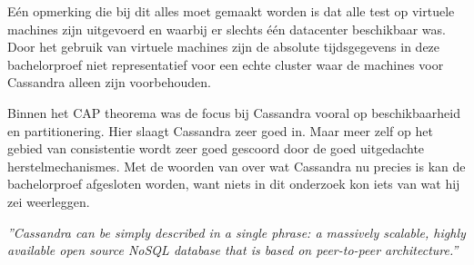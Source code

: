 Eén opmerking die bij dit alles moet gemaakt worden is dat alle test op virtuele machines zijn uitgevoerd en waarbij er slechts één datacenter beschikbaar was.
Door het gebruik van virtuele machines zijn de absolute tijdsgegevens in deze bachelorproef niet representatief voor een echte cluster waar de machines voor Cassandra alleen zijn voorbehouden.

Binnen het CAP theorema was de focus bij Cassandra vooral op beschikbaarheid en partitionering.
Hier slaagt Cassandra zeer goed in.
Maar meer zelf op het gebied van consistentie wordt zeer goed gescoord door de goed uitgedachte herstelmechanismes.
Met de woorden van \cite{kan2014cassandra} over wat Cassandra nu precies is kan de bachelorproef afgesloten worden, want niets in dit onderzoek kon iets van wat hij zei weerleggen.

\emph{
	''Cassandra can be simply described in a single phrase: a massively scalable, highly available open source NoSQL database that is based on peer-to-peer architecture.''
}
\citep{kan2014cassandra}
